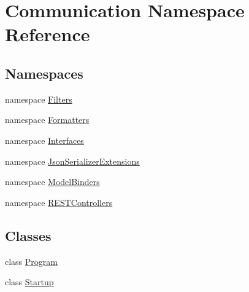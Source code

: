 \hypertarget{namespace_communication}{}\section{Communication Namespace Reference}
\label{namespace_communication}
\subsection*{Namespaces}
\begin{DoxyCompactItemize}
\item 
namespace \mbox{\hyperlink{namespace_communication_1_1_filters}{Filters}}
\item 
namespace \mbox{\hyperlink{namespace_communication_1_1_formatters}{Formatters}}
\item 
namespace \mbox{\hyperlink{namespace_communication_1_1_interfaces}{Interfaces}}
\item 
namespace \mbox{\hyperlink{namespace_communication_1_1_json_serializer_extensions}{Json\+Serializer\+Extensions}}
\item 
namespace \mbox{\hyperlink{namespace_communication_1_1_model_binders}{Model\+Binders}}
\item 
namespace \mbox{\hyperlink{namespace_communication_1_1_r_e_s_t_controllers}{R\+E\+S\+T\+Controllers}}
\end{DoxyCompactItemize}
\subsection*{Classes}
\begin{DoxyCompactItemize}
\item 
class \mbox{\hyperlink{class_communication_1_1_program}{Program}}
\item 
class \mbox{\hyperlink{class_communication_1_1_startup}{Startup}}
\end{DoxyCompactItemize}
